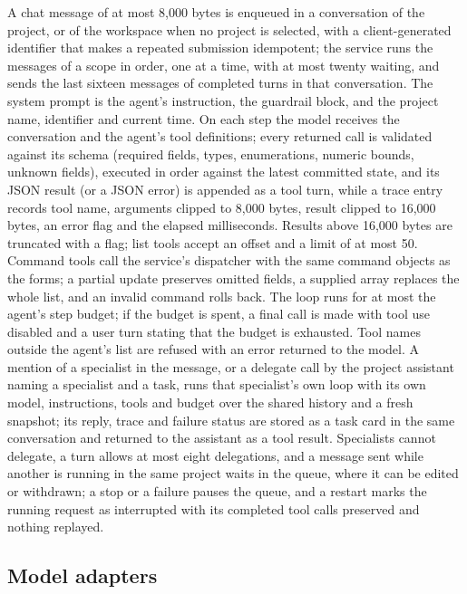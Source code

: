 \documentclass[11pt,a4paper]{article}
\begin{document}
A chat message of at most 8,000 bytes is enqueued in a conversation of
the project, or of the workspace when no project is selected, with a
client-generated identifier that makes a repeated submission idempotent;
the service runs the messages of a scope in order, one at a time, with
at most twenty waiting, and sends the last sixteen messages of completed
turns in that conversation. The system prompt is the agent's
instruction, the guardrail block, and the project name, identifier and
current time. On each step the model receives the conversation and the
agent's tool definitions; every returned call is validated against its
schema (required fields, types, enumerations, numeric bounds, unknown
fields), executed in order against the latest committed state, and its
JSON result (or a JSON error) is appended as a tool turn, while a trace
entry records tool name, arguments clipped to 8,000 bytes, result
clipped to 16,000 bytes, an error flag and the elapsed milliseconds.
Results above 16,000 bytes are truncated with a flag; list tools accept
an offset and a limit of at most 50. Command tools call the service's
dispatcher with the same command objects as the forms; a partial update
preserves omitted fields, a supplied array replaces the whole list, and
an invalid command rolls back. The loop runs for at most the agent's
step budget; if the budget is spent, a final call is made with tool use
disabled and a user turn stating that the budget is exhausted. Tool
names outside the agent's list are refused with an error returned to the
model. A mention of a specialist in the message, or a delegate call by
the project assistant naming a specialist and a task, runs that
specialist's own loop with its own model, instructions, tools and budget
over the shared history and a fresh snapshot; its reply, trace and
failure status are stored as a task card in the same conversation and
returned to the assistant as a tool result. Specialists cannot delegate,
a turn allows at most eight delegations, and a message sent while
another is running in the same project waits in the queue, where it can
be edited or withdrawn; a stop or a failure pauses the queue, and a
restart marks the running request as interrupted with its completed tool
calls preserved and nothing replayed.

\subsection{Model adapters}\label{model-adapters}
\end{document}

